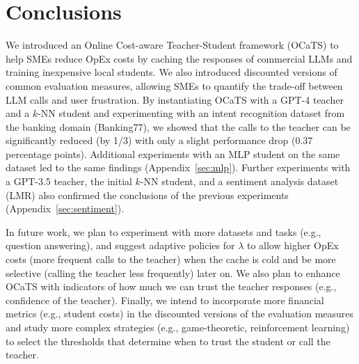 \documentclass[11pt]{article}
\begin{document}
\section{Conclusions}
We introduced an Online Cost-aware Teacher-Student framework (OCaTS) to help SMEs reduce OpEx costs by caching the responses of commercial LLMs and training inexpensive local students. We also introduced discounted versions of common evaluation measures, allowing SMEs to quantify the trade-off between LLM calls and user frustration. By instantiating OCaTS with a GPT-4 teacher and a $k$-NN student and experimenting with an intent recognition dataset from the banking domain (Banking77), we showed that the calls to the teacher can be significantly reduced (by 1/3) with only a slight performance drop (0.37 percentage points). Additional experiments with an MLP student  on the same dataset led to the same findings (Appendix~\ref{sec:mlp}). Further experiments with a GPT-3.5 teacher, the initial $k$-NN student, and a sentiment analysis dataset (LMR) also confirmed the conclusions of the previous experiments (Appendix~\ref{sec:sentiment}).    

In future work, we plan to experiment with more datasets and tasks (e.g., question answering), and suggest adaptive policies for $\lambda$ to allow higher OpEx costs (more frequent calls to the teacher) when the cache is cold and be more selective (calling the teacher less frequently) later on. We also plan to enhance OCaTS with indicators of how much we can trust the teacher responses (e.g., confidence of the teacher). Finally, we intend to incorporate more financial metrics (e.g., student costs) in the discounted versions of the evaluation measures and study more complex strategies (e.g., game-theoretic, reinforcement learning) to select the thresholds that determine when to trust the student or call the teacher.
\end{document}
